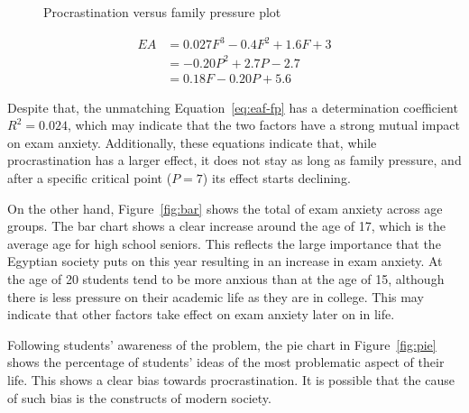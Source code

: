 \documentclass[12pt]{report}
\begin{document}
\begin{multicols}{2}
\begin{figure}[H]
    \caption{Procrastination versus family pressure plot}
    \label{fig:procrastination-family}
\end{figure}

\begin{align}
    \label{eq:eaf-f}
    EA &= 0.027 F^3 - 0.4 F^2 + 1.6 F + 3\\
       \label{eq:eaf-p}
       &= -0.20 P^2 + 2.7 P - 2.7\\
       \label{eq:eaf-fp}
       &= 0.18 F - 0.20 P + 5.6
\end{align}

Despite that, the unmatching Equation~\ref{eq:eaf-fp} has a determination
coefficient $R^2 = 0.024$, which may indicate that the two factors have a strong
mutual impact on exam anxiety. Additionally, these equations indicate that,
while procrastination has a larger effect, it does not stay as long as family
pressure, and after a specific critical point ($P=7$) its effect starts
declining.

On the other hand, Figure~\ref{fig:bar} shows the total of exam anxiety across
age groups. The bar chart shows a clear increase around the age of 17, which is
the average age for high school seniors. This reflects the large importance that
the Egyptian society puts on this year resulting in an increase in exam anxiety.
At the age of 20 students tend to be more anxious than at the age of 15,
although there is less pressure on their academic life as they are in college.
This may indicate that other factors take effect on exam anxiety later on in
life.

Following students' awareness of the problem, the pie chart in
Figure~\ref{fig:pie} shows the percentage of students' ideas of the most
problematic aspect of their life. This shows a clear bias towards
procrastination. It is possible that the cause of such bias is the constructs of
modern society. 


\end{multicols}
\end{document}
